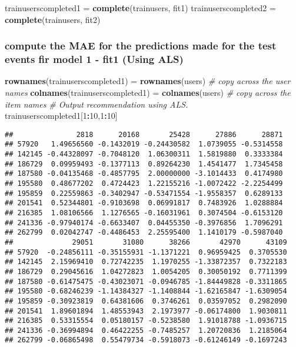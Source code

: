 \documentclass[]{article}
\newenvironment{Shaded}{\begin{snugshade}}{\end{snugshade}}
\newcommand{\CommentTok}[1]{\textcolor[rgb]{0.56,0.35,0.01}{\textit{#1}}}
\newcommand{\DecValTok}[1]{\textcolor[rgb]{0.00,0.00,0.81}{#1}}
\newcommand{\KeywordTok}[1]{\textcolor[rgb]{0.13,0.29,0.53}{\textbf{#1}}}
\newcommand{\NormalTok}[1]{#1}
\newcommand{\OperatorTok}[1]{\textcolor[rgb]{0.81,0.36,0.00}{\textbf{#1}}}
\newcommand{\StringTok}[1]{\textcolor[rgb]{0.31,0.60,0.02}{#1}}
\begin{document}
\begin{Shaded}
\begin{Highlighting}[]
\NormalTok{trainuserscompleted1 =}\StringTok{ }\KeywordTok{complete}\NormalTok{(trainusers, fit1)}
\NormalTok{trainuserscompleted2 =}\StringTok{ }\KeywordTok{complete}\NormalTok{(trainusers, fit2)}
\end{Highlighting}
\end{Shaded}

\hypertarget{compute-the-mae-for-the-predictions-made-for-the-test-events-fir-model-1---fit1-using-als}{%
\subsubsection{compute the MAE for the predictions made for the test
events fir model 1 - fit1 (Using
ALS)}\label{compute-the-mae-for-the-predictions-made-for-the-test-events-fir-model-1---fit1-using-als}}

\begin{Shaded}
\begin{Highlighting}[]
\KeywordTok{rownames}\NormalTok{(trainuserscompleted1) =}\StringTok{ }\KeywordTok{rownames}\NormalTok{(users) }\CommentTok{# copy across the user names}
\KeywordTok{colnames}\NormalTok{(trainuserscompleted1) =}\StringTok{ }\KeywordTok{colnames}\NormalTok{(users) }\CommentTok{# copy across the item names}
\CommentTok{# Output recommendation using ALS.}
\NormalTok{trainuserscompleted1[}\DecValTok{1}\OperatorTok{:}\DecValTok{10}\NormalTok{,}\DecValTok{1}\OperatorTok{:}\DecValTok{10}\NormalTok{]}
\end{Highlighting}
\end{Shaded}

\begin{verbatim}
##               2818      20168       25428      27886      28871
## 57920   1.49656560 -0.1432019 -0.24430582  1.0739055 -0.5314558
## 142145 -0.44328097 -0.7048120  1.06300311  1.5819880  0.3333384
## 186729  0.09959493 -0.1377113  0.89264230  1.4541477  1.7345458
## 187580 -0.04135468 -0.4857795  2.00000000 -3.1014433  0.4174980
## 195580  0.48677202  0.4724423  1.22155216 -1.0072422 -2.2254499
## 195859  0.22559863 -0.3402947 -0.53471554 -1.9558357  0.6289133
## 201541  0.52344801 -0.9103698  0.06991817  0.7483926  1.0288884
## 216385  1.08106566  1.1276565 -0.16031961  0.3074504 -0.6153120
## 241336 -0.97940174 -0.6633407  0.04455350 -0.3976856  1.7096291
## 262799  0.02042747 -0.4486453  2.25595400  1.1410179 -0.5987040
##              29051       31080      38266       42970      43109
## 57920  -0.24856111 -0.35155931 -1.1371221  0.96959425  0.3705530
## 142145  2.15969410  0.72742235  1.1970255 -1.33872357  0.7322183
## 186729  0.29045616  1.04272823  1.0054205  0.30050192  0.7711399
## 187580 -0.61475475 -0.43023071 -0.0946785 -1.84449828 -0.3311865
## 195580 -0.68246239 -1.14384327 -1.1408844 -1.62165847 -1.6309054
## 195859 -0.30923819  0.64381606  0.3746261  0.03597052  0.2982090
## 201541  1.89601894  1.48553943  2.1973977 -0.06174800  1.9030811
## 216385  0.53315554  0.05180157 -0.5238580  1.91018788 -1.0936715
## 241336 -0.36994894  0.46422255 -0.7485257  1.20720836  1.2185064
## 262799 -0.06865498  0.55479734 -0.5918073 -0.61246149 -0.1697243
\end{verbatim}
\end{document}
